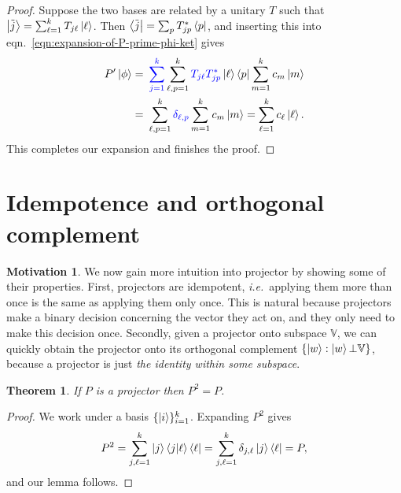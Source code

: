 \documentclass{article}
\theoremstyle{definition}
\newtheorem{mot}{Motivation}[section]
\theoremstyle{plain}
\newtheorem{thm}{Theorem}[section]
\numberwithin{equation}{section}
\begin{document}
\begin{proof}
    Suppose the two bases are related by a unitary 
    $T$ such that 
    $\ket{\tilde{j}} = 
    \sum_{\ell=1}^{k}T_{j \ell} \ket{\ell}$. 
    Then 
    $\bra{\tilde{j}}
    =
    \sum_{p}T_{jp}^{*} \bra{p}$, and 
    inserting this into eqn.\ 
    \ref{eqn:expansion-of-P-prime-phi-ket} gives 
    \begin{align}
        P' \ket{\phi} =&\ 
        \mathcolor{blue}{\sum_{j=1}^{k}}
        \sum_{\ell, p=1}^{k}
        \mathcolor{blue}{T_{j \ell}T_{jp}^{*}}
        \ket{\ell} \bra{p}
        \sum_{m=1}^{k} c_m \ket{m} \\
        =&\ 
        \sum_{\ell,p=1}^{k}
        \mathcolor{blue}{\delta_{\ell,p}}
        \sum_{m=1}^{k} c_m \ket{m} 
        = \sum_{\ell=1}^{k} c_{\ell} \ket{\ell}. 
    \end{align}
    This completes our expansion 
    and finishes the proof.
\end{proof}
\section{Idempotence and orthogonal complement}
\begin{mot}
    We now gain more intuition into 
    projector by showing some of their properties. 
    First, projectors are idempotent, 
    \textit{i.e.}~applying them more than once 
    is the same as applying them only once. 
    This is natural because projectors make a binary 
    decision concerning the vector they act on, 
    and they only need to make this decision once. 
    Secondly, given a projector onto subspace 
    $\mathbb{V}$, we can quickly obtain the 
    projector onto its orthogonal complement 
    $\{\ket{w}: \ket{w} \bot \mathbb{V}\}$, 
    because a projector is just 
    \emph{the identity within some subspace}.
    \label{mot:idempotence-and-orthogonal-complement}
\end{mot}

\begin{thm}
    If $P$ is a projector then $P^{2}=P$.
\end{thm}
\begin{proof}
    We work under a basis 
    $\{\ket{i}\}_{i = 1}^{k}$. 
    Expanding $P^{2}$ gives 
    \begin{equation}
        P^{2}
        =
        \sum_{j,\ell = 1}^{k}
        \ket{j}\bra{j}\ket{\ell}\bra{\ell}
        =
        \sum_{j,\ell=1}^{k}
        \delta_{j,\ell}
        \ket{j}\bra{\ell}
        =P,
    \end{equation}
    and our lemma follows.
\end{proof}
\end{document}

